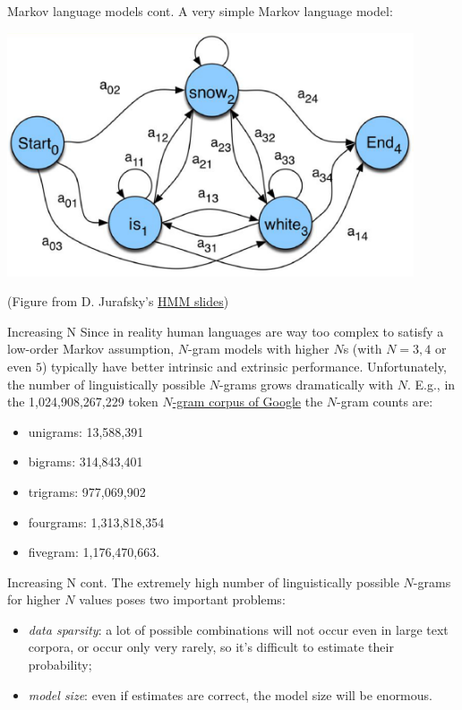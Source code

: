 \documentclass[style=upen, size=14pt]{powerdot}
\theoremstyle{definition}
\begin{document}
\begin{slide}[toc=]{Markov language models cont.}
  A very simple Markov language model:
  \begin{center}
    \includegraphics[width=0.9\textwidth]{figures/markov_lm.eps}
  \end{center}
  \small(Figure from D. Jurafsky's \href{https://slideplayer.com/slide/4578484/}{HMM slides})
\end{slide}

\begin{slide}[toc=Increasing N]{Increasing N}
  Since in reality human languages are way too complex to satisfy a low-order
  Markov assumption, $N$-gram models with higher $N$s (with $N=3,4$ or even $5$)
  typically have better intrinsic and extrinsic performance.
  Unfortunately, the number of linguistically possible $N$-grams grows
  dramatically with $N$. E.g., in the 1,024,908,267,229 token
  \href{https://catalog.ldc.upenn.edu/LDC2006T13}{$N$-gram corpus of Google} the
  $N$-gram counts are:
  \begin{itemize}
  \item unigrams: 13,588,391
  \item bigrams: 314,843,401
  \item trigrams: 977,069,902
  \item fourgrams: 1,313,818,354
  \item fivegram: 1,176,470,663.
  \end{itemize}
\end{slide}

\begin{slide}[toc=]{Increasing N cont.}
  The extremely high number of linguistically possible $N$-grams for higher $N$
  values poses two important problems:
  \begin{itemize}
  \item \emph{data sparsity}: a lot of possible combinations will not occur even
    in large text corpora, or occur only very rarely, so it's difficult to
    estimate their probability;
  \item \emph{model size}: even if estimates are correct, the model size will be
    enormous.
  \end{itemize}
\end{slide}
\end{document}
